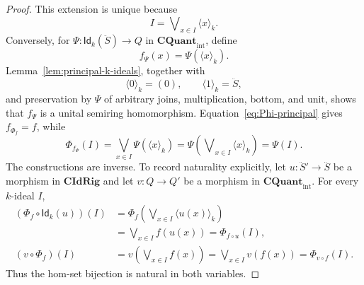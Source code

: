 \documentclass[10pt,a4paper]{amsart}
\newcommand{\CIdRig}{\mathbf{CIdRig}}
\newcommand{\Idk}{\mathsf{Id}_{k}}
\newcommand{\QuantTop}{\mathbf{CQuant}_{\mathrm{int}}}
\begin{document}
\begin{proof}
This extension is unique because
\[
I=\mathop{\bigvee{}^k}_{x\in I}\langle x\rangle_k.
\]
Conversely, for \(\Psi\colon\Idk(\ddot S)\to Q\) in \(\QuantTop\), define
\[
f_\Psi(x)=\Psi(\langle x\rangle_k).
\]
Lemma~\ref{lem:principal-k-ideals}, together with
\[
\langle0\rangle_k=(0),\qquad \langle1\rangle_k=\ddot S,
\]
and preservation by \(\Psi\) of arbitrary joins, multiplication, bottom, and unit, shows that \(f_\Psi\) is a unital semiring homomorphism. Equation~\eqref{eq:Phi-principal} gives \(f_{\Phi_f}=f\), while
\[
\Phi_{f_\Psi}(I)
 =\bigvee_{x\in I}\Psi(\langle x\rangle_k)
 =\Psi\left(\mathop{\bigvee{}^k}_{x\in I}\langle x\rangle_k\right)
 =\Psi(I).
\]
The constructions are inverse. To record naturality explicitly, let \(u\colon\ddot S'\to\ddot S\) be a morphism in \(\CIdRig\) and let \(v\colon Q\to Q'\) be a morphism in \(\QuantTop\). For every $k$-ideal $I$,
\begin{align*}
(\Phi_f\circ\Idk(u))(I)
 &=\Phi_f\left(\mathop{\bigvee{}^k}_{x\in I}\langle u(x)\rangle_k\right)\\
 &=\bigvee_{x\in I} f(u(x))
  =\Phi_{f\circ u}(I),\\
(v\circ\Phi_f)(I)
 &=v\left(\bigvee_{x\in I}f(x)\right)
  =\bigvee_{x\in I}v(f(x))
  =\Phi_{v\circ f}(I).
\end{align*}
Thus the hom-set bijection is natural in both variables.
\end{proof}
\end{document}
